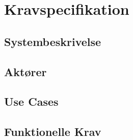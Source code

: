 
\chapter{Kravspecifikation}


\section{Systembeskrivelse}



\section{Aktører}


\newpage
\section{Use Cases}


\newpage
\section{Funktionelle Krav}


\newpage

